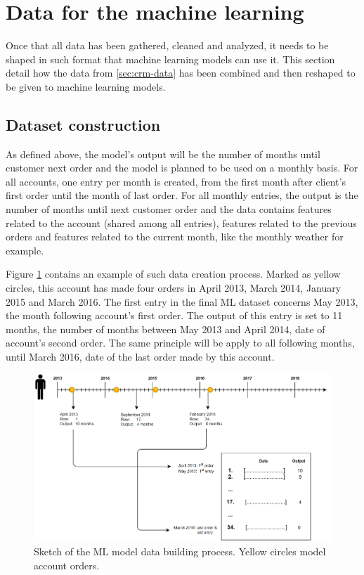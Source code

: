 \section{Data for the machine learning}
Once that all data has been gathered, cleaned and analyzed, it needs to be shaped in such format that machine learning models can use it. This section detail how the data from \ref{sec:crm-data} has been combined and then reshaped to be given to machine learning models.

\subsection{Dataset construction}\label{sec:data-shape-for-ml}
As defined above, the model's output will be the number of months until customer next order and the model is planned to be used on a monthly basis. For all accounts, one entry per month is created, from the first month after client's first order until the month of last order. For all monthly entries, the output is the number of months until next customer order and the data contains features related to the account (shared among all entries), features related to the previous orders and features related to the current month, like the monthly weather for example. 

Figure \ref{fig:data-build-example} contains an example of such data creation process. Marked as yellow circles, this account has made four orders in April 2013, March 2014, January 2015 and March 2016. The first entry in the final ML dataset concerns May 2013, the month following account's first order. The output of this entry is set to 11 months, the number of months between May 2013 and April 2014, date of account's second order. The same principle will be apply to all following months, until March 2016, date of the last order made by this account.

\begin{figure}[h]
    \centering
    \includegraphics[width=14cm]{images/data-build-ml-example.png}
    \caption[Process to build data for machine learning]{Sketch of the ML model data building process. Yellow circles model account orders.}
    \label{fig:data-build-example}
\end{figure}


